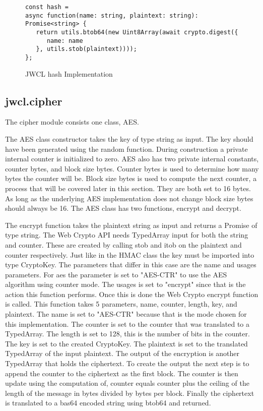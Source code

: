 \begin{figure}[!htbp]
\centering
 \begin{lstlisting}[basicstyle=\small]
const hash = 
async function(name: string, plaintext: string): Promise<string> {
   return utils.btob64(new Uint8Array(await crypto.digest({
      name: name
   }, utils.stob(plaintext))));
};
 \end{lstlisting}
\caption{JWCL hash Implementation}
\label{fig:jwcl.hash}
\end{figure}

\subsection{jwcl.cipher}


The cipher module consists one class, AES.


The AES class constructor takes the key of type string as input. The key should have been generated using the random function. During construction a private internal counter is initialized to zero. AES also has two private internal constants, counter bytes, and block size bytes. Counter bytes is used to determine how many bytes the counter will be. Block size bytes is used to compute the next counter, a process that will be covered later in this section. They are both set to 16 bytes. As long as the underlying AES implementation does not change block size bytes should always be 16. The AES class has two functions, encrypt and decrypt.


The encrypt function takes the plaintext string as input and returns a Promise of type string. The Web Crypto API needs TypedArray input for both the string and counter. These are created by calling stob and itob on the plaintext and counter respectively. Just like in the HMAC class the key must be imported into type CryptoKey. The parameters that differ in this case are the name and usages parameters. For aes the parameter is set to "AES-CTR" to use the AES algorithm using counter mode. The usages is set to "encrypt" since that is the action this function performs. Once this is done the Web Crypto encrypt function is called. This function takes 5 parameters, name, counter, length, key, and plaintext. The name is set to "AES-CTR" because that is the mode chosen for this implementation. The counter is set to the counter that was translated to a TypedArray. The length is set to 128, this is the number of bits in the counter. The key is set to the created CryptoKey. The plaintext is set to the translated TypedArray of the input plaintext. The output of the encryption is another TypedArray that holds the ciphertext. To create the output the next step is to append the counter to the ciphertext as the first block. The counter is then update using the computation of, counter equals counter plus the ceiling of the length of the message in bytes divided by bytes per block. Finally the ciphertext is translated to a bas64 encoded string using btob64 and returned.


